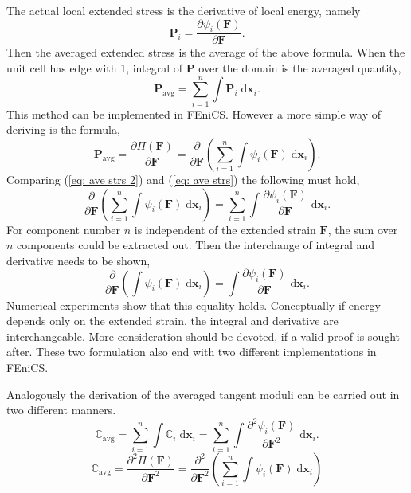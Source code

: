 \documentclass[10pt,a4paper]{scrreprt}
\newcommand{\myd}{\;\mathrm{d}}
\begin{document}
The actual local extended stress is the derivative of local energy, namely
\begin{equation}
\label{eq: loc en}
\mathbf{P}_{i} = \dfrac{\partial \psi_{i}(\mathbf{F})}{\partial \mathbf{F}}.
\end{equation}
Then the averaged extended stress is the average of the above formula. When the unit cell has edge with 1, integral of $\mathbf{P}$ over the domain is the averaged quantity,
\begin{equation}
\label{eq: ave strs}
\mathbf{P}_{\text{avg}} = \sum^{n}_{i=1} \int \mathbf{P}_{i} \myd{\mathbf{x}_{i}}.
\end{equation}
This method can be implemented in FEniCS. However a more simple way of deriving is the formula,
\begin{equation}
\label{eq: ave strs 2}
\mathbf{P}_{\text{avg}} = \dfrac{\partial \Pi(\mathbf{F})}{\partial \mathbf{F}} = \dfrac{\partial}{\partial \mathbf{F}} \left( \sum^{n}_{i=1} \int \psi_{i}(\mathbf{F}) \myd{\mathbf{x}_{i}} \right).
\end{equation}
Comparing (\ref{eq: ave strs 2}) and (\ref{eq: ave strs}) the following must hold,
\begin{equation}
\label{eq: equality}
\dfrac{\partial}{\partial \mathbf{F}} \left( \sum^{n}_{i=1} \int \psi_{i}(\mathbf{F}) \myd{\mathbf{x}_{i}} \right) = \sum^{n}_{i=1} \int \dfrac{\partial \psi_{i}(\mathbf{F})}{\partial \mathbf{F}} \myd{\mathbf{x}_{i}}.
\end{equation}
For component number $n$ is independent of the extended strain $\mathbf{F}$, the sum over $n$ components could be extracted out. Then the interchange of integral and derivative needs to be shown, 
\begin{equation}
\label{eq: interchange}
\dfrac{\partial}{\partial \mathbf{F}} \left( \int \psi_{i}(\mathbf{F}) \myd{\mathbf{x}_{i}} \right) = \int \dfrac{\partial \psi_{i}(\mathbf{F})}{\partial \mathbf{F}} \myd{\mathbf{x}_{i}}.
\end{equation}
Numerical experiments show that this equality holds. Conceptually if energy depends only on the extended strain, the integral and derivative are interchangeable. More consideration should be devoted, if a valid proof is sought after. These two formulation also end with two different implementations in FEniCS.

Analogously the derivation of the averaged tangent moduli can be carried out in two different manners. 
\begin{equation}
\label{eq: tan mod}
\mathbb{C}_{\text{avg}} = \sum^{n}_{i=1} \int \mathbb{C}_{i} \myd{\mathbf{x}_{i}} = \sum^{n}_{i=1} \int \dfrac{\partial^{2} \psi_{i}(\mathbf{F})}{\partial \mathbf{F}^{2}} \myd{\mathbf{x}_{i}}.
\end{equation}
\begin{equation}
\label{eq: tan mod 2}
\mathbb{C}_{\text{avg}} = \dfrac{\partial^{2} \Pi(\mathbf{F})}{\partial \mathbf{F}^{2}} = \dfrac{\partial^{2}}{\partial \mathbf{F}^{2}} \left( \sum^{n}_{i=1} \int \psi_{i}(\mathbf{F}) \myd{\mathbf{x}_{i}} \right)
\end{equation}
\end{document}

